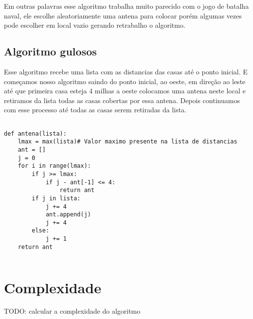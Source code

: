 \documentclass[11pt]{article}
\begin{document}
Em outras palavras esse algoritmo trabalha muito parecido com o jogo de batalha naval, ele escolhe aleatoriamente uma antena para
colocar porém algumas vezes pode escolher em local vazio gerando retrabalho o algoritmo.

\subsection{Algoritmo gulosos}

\label{sec-3-3}

Esse algoritmo recebe uma lista com as distancias das casas até o ponto inicial. 
E começamos nosso algoritmo saindo do ponto inicial, ao oeste, em direção ao leste até que primeira casa esteja 4 milhas a oeste 
colocamos uma antena neste local e retiramos da lista todas as casas cobertas por essa antena. Depois continuamos com esse processo
até todas as casas serem retiradas da lista.

\begin{verbatim}

def antena(lista):
    lmax = max(lista)# Valor maximo presente na lista de distancias
    ant = []
    j = 0
    for i in range(lmax):
        if j >= lmax:
            if j - ant[-1] <= 4:
                return ant
        if j in lista:
            j += 4
            ant.append(j)
            j += 4
        else:
            j += 1
    return ant
 
\end{verbatim}



\section{Complexidade}
\label{sec-5}

TODO: calcular a complexidade do algoritmo
\end{document}
